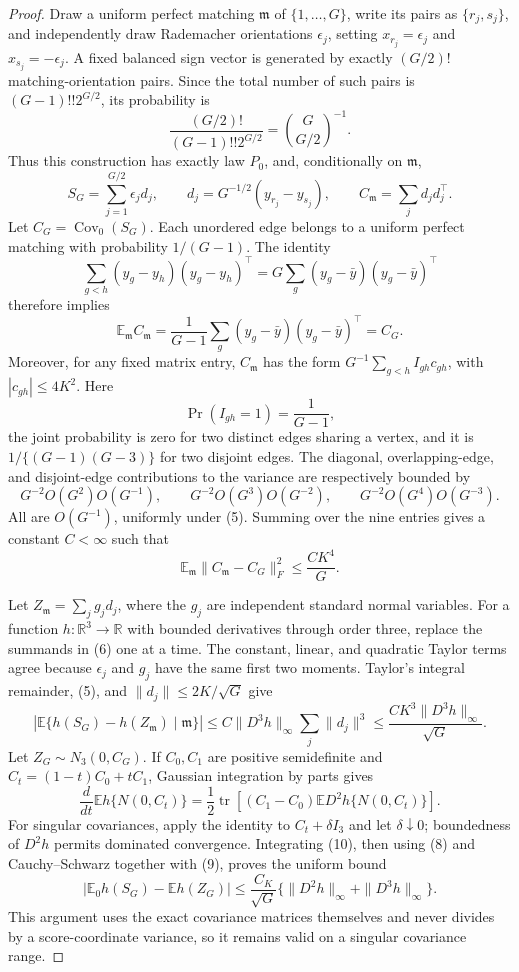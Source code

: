 \documentclass{article}
\begin{document}
\begin{proof}
Draw a uniform perfect matching \(\mathfrak m\) of \(\{1,\ldots,G\}\), write its pairs as \(\{r_j,s_j\}\), and independently draw Rademacher orientations \(\epsilon_j\), setting \(x_{r_j}=\epsilon_j\) and \(x_{s_j}=-\epsilon_j\).  A fixed balanced sign vector is generated by exactly \((G/2)!\) matching-orientation pairs.  Since the total number of such pairs is \((G-1)!!2^{G/2}\), its probability is
\[
\frac{(G/2)!}{(G-1)!!2^{G/2}}=\binom{G}{G/2}^{-1}.
\]
Thus this construction has exactly law \(P_0\), and, conditionally on \(\mathfrak m\),
\[
S_G=\sum_{j=1}^{G/2}\epsilon_jd_j,
\qquad
d_j=G^{-1/2}(y_{r_j}-y_{s_j}),
\qquad
C_{\mathfrak m}=\sum_jd_jd_j^\top.                       \tag{6}
\]
Let \(C_G=\operatorname{Cov}_0(S_G)\).  Each unordered edge belongs to a uniform perfect matching with probability \(1/(G-1)\).  The identity
\[
\sum_{g<h}(y_g-y_h)(y_g-y_h)^\top
=G\sum_g(y_g-\bar y)(y_g-\bar y)^\top
\]
therefore implies
\[
\mathbb E_{\mathfrak m}C_{\mathfrak m}
=\frac1{G-1}\sum_g(y_g-\bar y)(y_g-\bar y)^\top=C_G.    \tag{7}
\]
Moreover, for any fixed matrix entry, \(C_{\mathfrak m}\) has the form \(G^{-1}\sum_{g<h}I_{gh}c_{gh}\), with \(|c_{gh}|\leq4K^2\).  Here
\[
\Pr(I_{gh}=1)=\frac1{G-1},
\]
the joint probability is zero for two distinct edges sharing a vertex, and it is \(1/\{(G-1)(G-3)\}\) for two disjoint edges.  The diagonal, overlapping-edge, and disjoint-edge contributions to the variance are respectively bounded by
\[
G^{-2}O(G^2)O(G^{-1}),\qquad
G^{-2}O(G^3)O(G^{-2}),\qquad
G^{-2}O(G^4)O(G^{-3}).
\]
All are \(O(G^{-1})\), uniformly under (5).  Summing over the nine entries gives a constant \(C<\infty\) such that
\[
\mathbb E_{\mathfrak m}\|C_{\mathfrak m}-C_G\|_F^2
\leq \frac{CK^4}{G}.                                     \tag{8}
\]

Let \(Z_{\mathfrak m}=\sum_jg_jd_j\), where the \(g_j\) are independent standard normal variables.  For a function \(h:\mathbb R^3\to\mathbb R\) with bounded derivatives through order three, replace the summands in (6) one at a time.  The constant, linear, and quadratic Taylor terms agree because \(\epsilon_j\) and \(g_j\) have the same first two moments.  Taylor's integral remainder, (5), and \(\|d_j\|\leq2K/\sqrt G\) give
\[
\left|\mathbb E\{h(S_G)-h(Z_{\mathfrak m})\mid\mathfrak m\}\right|
\leq C\|D^3h\|_\infty\sum_j\|d_j\|^3
\leq \frac{CK^3\|D^3h\|_\infty}{\sqrt G}.              \tag{9}
\]
Let \(Z_G\sim N_3(0,C_G)\).  If \(C_0,C_1\) are positive semidefinite and \(C_t=(1-t)C_0+tC_1\), Gaussian integration by parts gives
\[
\frac{d}{dt}\mathbb Eh\{N(0,C_t)\}
=\frac12\operatorname{tr}\left[(C_1-C_0)
                 \mathbb ED^2h\{N(0,C_t)\}\right].      \tag{10}
\]
For singular covariances, apply the identity to \(C_t+\delta I_3\) and let \(\delta\downarrow0\); boundedness of \(D^2h\) permits dominated convergence.  Integrating (10), then using (8) and Cauchy--Schwarz together with (9), proves the uniform bound
\[
\left|\mathbb E_0h(S_G)-\mathbb Eh(Z_G)\right|
\leq\frac{C_K}{\sqrt G}
 \{\|D^2h\|_\infty+\|D^3h\|_\infty\}.                 \tag{11}
\]
This argument uses the exact covariance matrices themselves and never divides by a score-coordinate variance, so it remains valid on a singular covariance range.


\end{proof}
\end{document}
